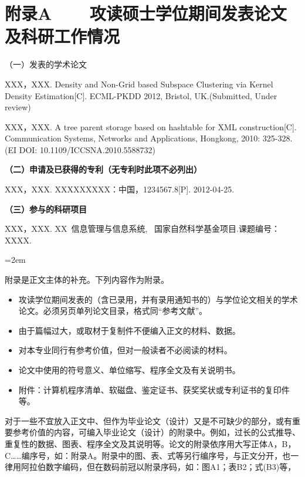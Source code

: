 \chapter*{附录A~~~~攻读硕士学位期间发表论文及科研工作情况}
\setlength{\parindent}{0em}
（一）发表的学术论文
\begin{publist}
	\item XXX，XXX. Density and Non-Grid based Subspace Clustering via Kernel Density Estimation[C]. ECML-PKDD 2012, Bristol, UK.(Submitted, Under review)
	\item XXX，XXX. A tree parent storage based on hashtable for XML construction[C]. Communication Systems, Networks and Applications, Hongkong, 2010: 325-328. (EI DOI: 10.1109/ICCSNA.2010.5588732)
\end{publist}
\vspace*{1em}
\textbf{（二）申请及已获得的专利（无专利时此项不必列出）}
\begin{publist}
	\item XXX，XXX. XXXXXXXXX：中国，1234567.8[P]. 2012-04-25.
\end{publist}
\vspace*{1em}
\textbf{（三）参与的科研项目}
\begin{publist}
	\item XXX，XXX. XX~信息管理与信息系统, ~国家自然科学基金项目.课题编号：XXXX.
\end{publist}
{}\hangindent=2em\noindent
\setlength{\parindent}{2em}

附录是正文主体的补充。下列内容作为附录。
\begin{itemize}
	\item 攻读学位期间发表的（含已录用，并有录用通知书的）与学位论文相关的学术论文。必须另页单列论文目录，格式同“参考文献”。
	\item 由于篇幅过大，或取材于复制件不便编入正文的材料、数据。
	\item 对本专业同行有参考价值，但对一般读者不必阅读的材料。
	\item 论文中使用的符号意义、单位缩写、程序全文及有关说明书。
	\item 附件：计算机程序清单、软磁盘、鉴定证书、获奖奖状或专利证书的复印件等。
\end{itemize}

对于一些不宜放入正文中、但作为毕业论文（设计）又是不可缺少的部分，或有重要参考价值的内容，可编入毕业论文（设计）的附录中。例如，过长的公式推导、重复性的数据、图表、程序全文及其说明等。论文的附录依序用大写正体A，B，C……编序号，如：附录A。附录中的图、表、式等另行编序号，与正文分开，也一律用阿拉伯数字编码，但在数码前冠以附录序码，如：图A1；表B2；式(B3)等，

